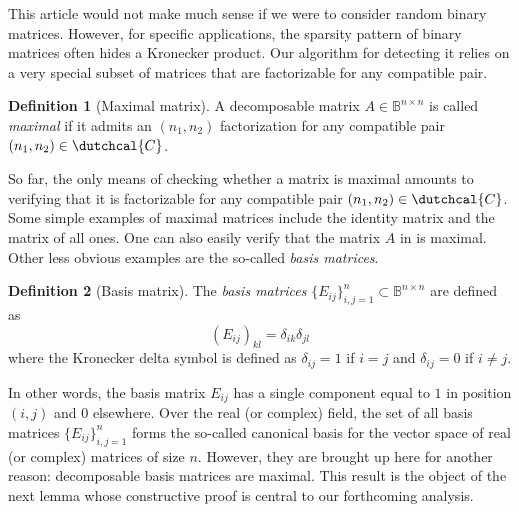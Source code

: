\documentclass{article}
\numberwithin{equation}{section}
\theoremstyle{definition}
\newtheorem{definition}{Definition}[section]
\begin{document}
This article would not make much sense if we were to consider random binary matrices. However, for specific applications, the sparsity pattern of binary matrices often hides a Kronecker product. Our algorithm for detecting it relies on a very special subset of matrices that are factorizable for any compatible pair.

\begin{definition}[Maximal matrix]
A decomposable matrix $A \in \mathbb{B}^{n \times n}$ is called \emph{maximal} if it admits an $(n_1,n_2)$ factorization for any compatible pair $(n_1,n_2) \in \dutchcal{C}$.
\end{definition}

So far, the only means of checking whether a matrix is maximal amounts to verifying that it is factorizable for any compatible pair $(n_1,n_2) \in \dutchcal{C}$. Some simple examples of maximal matrices include the identity matrix and the matrix of all ones. One can also easily verify that the matrix $A$ in  is maximal. Other less obvious examples are the so-called \emph{basis matrices}.

\begin{definition}[Basis matrix]
The \emph{basis matrices} $\{E_{ij}\}_{i,j=1}^n \subset \mathbb{B}^{n \times n}$ are defined as
\begin{equation*}
    (E_{ij})_{kl} = \delta_{ik}\delta_{jl}
\end{equation*}
where the Kronecker delta symbol is defined as $\delta_{ij}=1$ if $i=j$ and $\delta_{ij}=0$ if $i \neq j$.
\end{definition}

In other words, the basis matrix $E_{ij}$ has a single component equal to $1$ in position $(i,j)$ and $0$ elsewhere. Over the real (or complex) field, the set of all basis matrices $\{E_{ij}\}_{i,j=1}^n$ forms the so-called canonical basis for the vector space of real (or complex) matrices of size $n$. However, they are brought up here for another reason: decomposable basis matrices are maximal. This result is the object of the next lemma whose constructive proof is central to our forthcoming analysis.
\end{document}
